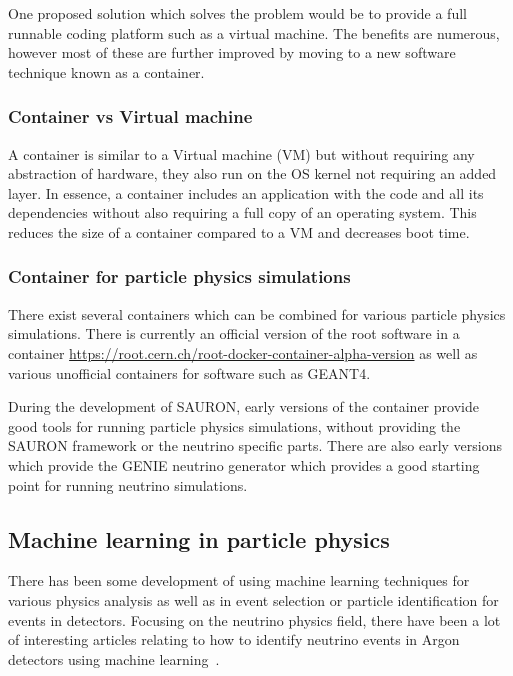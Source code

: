 One proposed solution which solves the problem would be to provide a full runnable coding platform such as a virtual machine. The benefits are numerous, however most of these are further improved by moving to a new software technique known as a container.

\subsubsection{Container vs Virtual machine}

A container is similar to a Virtual machine (VM) but without requiring any abstraction of hardware, they also run on the OS kernel not requiring an added layer. In essence, a container includes an application with the code and all its dependencies without also requiring a full copy of an operating system. This reduces the size of a container compared to a VM and decreases boot time.

\subsubsection{Container for particle physics simulations}
There exist several containers which can be combined for various particle physics simulations. There is currently an official version of the root software in a container \url{https://root.cern.ch/root-docker-container-alpha-version} as well as various unofficial containers for software such as GEANT4.

During the development of SAURON, early versions of the container provide good tools for running particle physics simulations, without providing the SAURON framework or the neutrino specific parts. There are also early versions which provide the GENIE neutrino generator which provides a good starting point for running neutrino simulations.

\subsection{Machine learning in particle physics}

There has been some development of using machine learning techniques for various physics analysis as well as in event selection or particle identification for events in detectors. Focusing on the neutrino physics field, there have been a lot of interesting articles relating to how to identify neutrino events in Argon detectors using machine learning~\cite{83Radovic2018, 84Adams}. 

